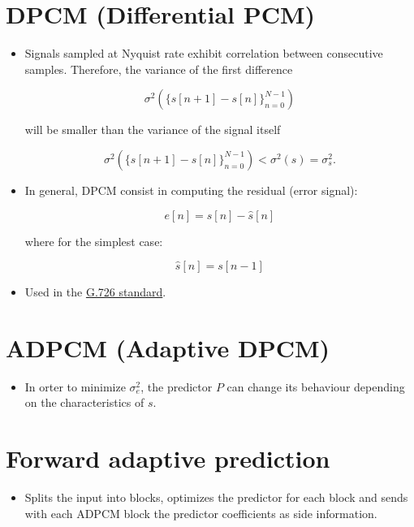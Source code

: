 \section{DPCM (Differential PCM)}
\begin{itemize}
\item
  Signals sampled at Nyquist rate exhibit correlation between
  consecutive samples. Therefore, the variance of the first difference

  \begin{equation}
    \sigma^2(\{s[n+1]-s[n]\}_{n=0}^{N-1})
  \end{equation}

  will be smaller than the variance of the signal itself

  \begin{equation}
    \sigma^2(\{s[n+1]-s[n]\}_{n=0}^{N-1}) < \sigma^2(s) = \sigma_s^2.
  \end{equation}
\item
  In general, DPCM consist in computing the residual (error signal):

  \begin{equation}
    e[n] = s[n] - \hat{s}[n]
  \end{equation}

  where for the simplest case:

  \begin{equation}
    \hat{s}[n] = s[n-1]
  \end{equation}
\item
  Used in the \href{https://en.wikipedia.org/wiki/G.726}{G.726
  standard}.
\end{itemize}

\section{ADPCM (Adaptive DPCM)}
\begin{itemize}
\tightlist
\item
  In orter to minimize \(\sigma^2_e\), the predictor \(P\) can change
  its behaviour depending on the characteristics of \(s\).
\end{itemize}

\section{Forward adaptive prediction}
\begin{itemize}
\tightlist
\item
  Splits the input into blocks, optimizes the predictor for each block
  and sends with each ADPCM block the predictor coefficients as side
  information.
\end{itemize}

